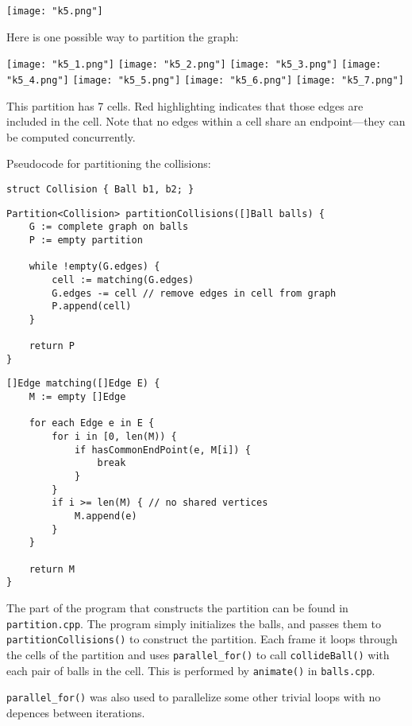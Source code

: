 \documentclass{article}
\begin{document}
\texttt{[image: "k5.png"]}

Here is one possible way to partition the graph:

\texttt{[image: "k5\_1.png"]}
\texttt{[image: "k5\_2.png"]}
\texttt{[image: "k5\_3.png"]}
\texttt{[image: "k5\_4.png"]}
\texttt{[image: "k5\_5.png"]}
\texttt{[image: "k5\_6.png"]}
\texttt{[image: "k5\_7.png"]}

This partition has 7 cells.
Red highlighting indicates that those edges are included in the cell.
Note that no edges within a cell share an endpoint---they can be computed concurrently.

Pseudocode for partitioning the collisions:
\begin{lstlisting}
struct Collision { Ball b1, b2; }
\end{lstlisting}
\begin{lstlisting}
Partition<Collision> partitionCollisions([]Ball balls) {
	G := complete graph on balls
	P := empty partition

	while !empty(G.edges) {
		cell := matching(G.edges)
		G.edges -= cell // remove edges in cell from graph
		P.append(cell)
	}

	return P
}
\end{lstlisting}
\begin{lstlisting}
[]Edge matching([]Edge E) {
	M := empty []Edge

	for each Edge e in E {
		for i in [0, len(M)) {
			if hasCommonEndPoint(e, M[i]) {
				break
			}
		}
		if i >= len(M) { // no shared vertices
			M.append(e)
		}
	}

	return M
}
\end{lstlisting}

The part of the program that constructs the partition can be found in \texttt{partition.cpp}.
The program simply initializes the balls, and passes them to \texttt{partitionCollisions()} to construct the partition.
Each frame it loops through the cells of the partition and uses \texttt{parallel\_for()} to call \texttt{collideBall()} with each pair of balls in the cell.
This is performed by \texttt{animate()} in \texttt{balls.cpp}.

\texttt{parallel\_for()} was also used to parallelize some other trivial loops with no depences between iterations.
\end{document}
